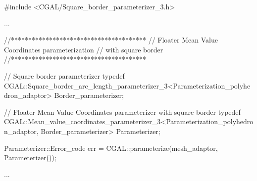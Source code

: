 \begin{ccExampleCode}

#include <CGAL/Square_border_parameterizer_3.h>

...

//***************************************
// Floater Mean Value Coordinates parameterization
// with square border
//***************************************

// Square border parameterizer
typedef CGAL::Square_border_arc_length_parameterizer_3<Parameterization_polyhedron_adaptor>
                                                        Border_parameterizer;

// Floater Mean Value Coordinates parameterizer with square border
typedef CGAL::Mean_value_coordinates_parameterizer_3<Parameterization_polyhedron_adaptor,
                                                        Border_parameterizer>
                                                    Parameterizer;

Parameterizer::Error_code err = CGAL::parameterize(mesh_adaptor, Parameterizer());

...

\end{ccExampleCode}

